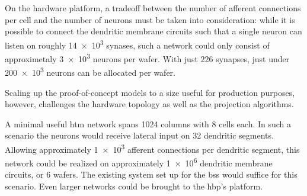 On the hardware platform, a tradeoff between the number of afferent connections per cell and the number of neurons must be taken into consideration: while it is possible to connect the dendritic membrane circuits such that a single neuron can listen on roughly \num{14e3} synases, such a network could only consist of approximetaly \num{3e3} neurons per wafer. With just 226 synapses, just under \num{200e3} neurons can be allocated per wafer.

Scaling up the proof-of-concept models to a size useful for production purposes, however, challenges the hardware topology as well as the projection algorithms.

A minimal useful \gls{htm} network spans 1024 columns with 8 cells each. In such a scenario the neurons would receive lateral input on 32 dendritic segments. Allowing approximately \num{1e3} afferent connections per dendritic segment, this network could be realized on approximately \num{1e6} dendritic membrane circuits, or 6 wafers. The existing system set up for the \gls{bss} would suffice for this scenario. Even larger networks could be brought to the \gls{hbp}'s platform.
